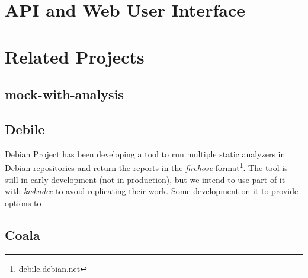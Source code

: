 
\section{API and Web User Interface}

\section{Related Projects}

\subsection{mock-with-analysis}

\subsection{Debile}
Debian Project has been developing a tool to run multiple static analyzers in
Debian repositories and return the reports in the \textit{firehose}
format\footnote{\url{debile.debian.net}}.  The tool is still in early development
(not in production), but we intend to use part of it with \textit{kiskadee} to
avoid replicating their work. Some development on it to provide options to

\subsection{Coala}

